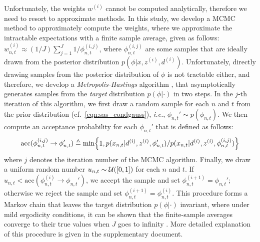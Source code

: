 Unfortunately, the weights $w^{(i)}$ cannot be computed analytically, therefore we need to resort to
approximate methods. In this study, we develop a \ac{MCMC} method to approximately compute the weights, where we approximate the intractable expectations with a finite sample average, given as follows: $w_{n,t}^{(i)} \approx (1/{J}) \sum_{j=1}^{J} 1/{\phi_{n,t}^{(i,j)}}$, where $\phi_{n,t}^{(i,j)}$ are some samples that are ideally drawn from the posterior distribution $p(\phi|x,z^{(i)},d^{(i)})$. Unfortunately, directly drawing samples from the posterior distribution of $\phi$ is not tractable either, and therefore, we develop a \emph{Metropolis-Hastings} algorithm \citep{chib1995understanding}, that asymptotically generates samples from the \emph{target} distribution $p(\phi|\cdot)$ in two steps. In the $j$-th iteration of this algorithm, we first draw a random sample for each $n$ and $t$ from the prior distribution (cf.\ \eqref{eqn:sas_condgauss}), \textit{i.e.}, $\phi_{n,t}'\sim p(\phi_{n,t})$. We then compute an acceptance probability for each $\phi_{n,t}'$ that is defined as follows:
%
\begin{align}
  \text{acc}(\phi_{n,t}^{(i,j)} \rightarrow \phi_{n,t}' ) \triangleq \min \Bigl\{1, {p(x_{n,t}|d^{(i)},z^{(i)},\phi'_{n,t})}/{p(x_{n,t}|d^{(i)},z^{(i)},\phi_{n,t}^{(i,j)})} \Bigr\} \label{eqn:mcmc_acc}
\end{align}
%
where $j$ denotes the iteration number of the \ac{MCMC} algorithm. 
Finally, we draw a uniform random number $u_{n,t} \sim {\cal U}([0, 1])$ for each $n$ and $t$. If $u_{n,t} < \text{acc}(\phi_{n,t}^{(i)} \rightarrow \phi_{n,t}')$, we accept the sample and set $\phi_{n,t}^{(i+1)} = \phi_{n,t}'$; otherwise we reject the sample and set $\phi_{n,t}^{(i+1)} = \phi_{n,t}^{(i)}$. This procedure forms a Markov chain that leaves the target distribution $p(\phi|\cdot)$ invariant, where under mild ergodicity conditions, it can be shown that the finite-sample averages converge to their true values when $J$ goes to infinity \citep{Liu2008}. More detailed explanation of this procedure is given in the supplementary document.

%

%
